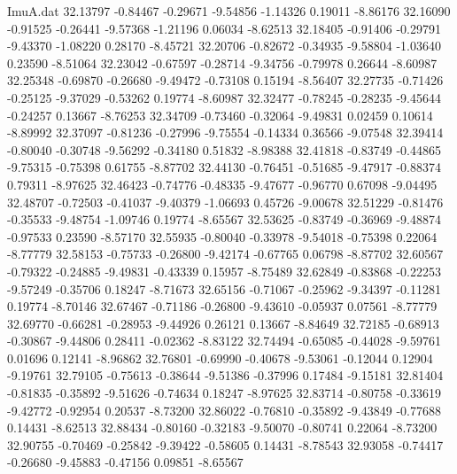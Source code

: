 \begin{filecontents}{ImuA.dat}
  32.13797   -0.84467   -0.29671   -9.54856   -1.14326    0.19011   -8.86176
  32.16090   -0.91525   -0.26441   -9.57368   -1.21196    0.06034   -8.62513
  32.18405   -0.91406   -0.29791   -9.43370   -1.08220    0.28170   -8.45721
  32.20706   -0.82672   -0.34935   -9.58804   -1.03640    0.23590   -8.51064
  32.23042   -0.67597   -0.28714   -9.34756   -0.79978    0.26644   -8.60987
  32.25348   -0.69870   -0.26680   -9.49472   -0.73108    0.15194   -8.56407
  32.27735   -0.71426   -0.25125   -9.37029   -0.53262    0.19774   -8.60987
  32.32477   -0.78245   -0.28235   -9.45644   -0.24257    0.13667   -8.76253
  32.34709   -0.73460   -0.32064   -9.49831    0.02459    0.10614   -8.89992
  32.37097   -0.81236   -0.27996   -9.75554   -0.14334    0.36566   -9.07548
  32.39414   -0.80040   -0.30748   -9.56292   -0.34180    0.51832   -8.98388
  32.41818   -0.83749   -0.44865   -9.75315   -0.75398    0.61755   -8.87702
  32.44130   -0.76451   -0.51685   -9.47917   -0.88374    0.79311   -8.97625
  32.46423   -0.74776   -0.48335   -9.47677   -0.96770    0.67098   -9.04495
  32.48707   -0.72503   -0.41037   -9.40379   -1.06693    0.45726   -9.00678
  32.51229   -0.81476   -0.35533   -9.48754   -1.09746    0.19774   -8.65567
  32.53625   -0.83749   -0.36969   -9.48874   -0.97533    0.23590   -8.57170
  32.55935   -0.80040   -0.33978   -9.54018   -0.75398    0.22064   -8.77779
  32.58153   -0.75733   -0.26800   -9.42174   -0.67765    0.06798   -8.87702
  32.60567   -0.79322   -0.24885   -9.49831   -0.43339    0.15957   -8.75489
  32.62849   -0.83868   -0.22253   -9.57249   -0.35706    0.18247   -8.71673
  32.65156   -0.71067   -0.25962   -9.34397   -0.11281    0.19774   -8.70146
  32.67467   -0.71186   -0.26800   -9.43610   -0.05937    0.07561   -8.77779
  32.69770   -0.66281   -0.28953   -9.44926    0.26121    0.13667   -8.84649
  32.72185   -0.68913   -0.30867   -9.44806    0.28411   -0.02362   -8.83122
  32.74494   -0.65085   -0.44028   -9.59761    0.01696    0.12141   -8.96862
  32.76801   -0.69990   -0.40678   -9.53061   -0.12044    0.12904   -9.19761
  32.79105   -0.75613   -0.38644   -9.51386   -0.37996    0.17484   -9.15181
  32.81404   -0.81835   -0.35892   -9.51626   -0.74634    0.18247   -8.97625
  32.83714   -0.80758   -0.33619   -9.42772   -0.92954    0.20537   -8.73200
  32.86022   -0.76810   -0.35892   -9.43849   -0.77688    0.14431   -8.62513
  32.88434   -0.80160   -0.32183   -9.50070   -0.80741    0.22064   -8.73200
  32.90755   -0.70469   -0.25842   -9.39422   -0.58605    0.14431   -8.78543
  32.93058   -0.74417   -0.26680   -9.45883   -0.47156    0.09851   -8.65567

\end{filecontents}
